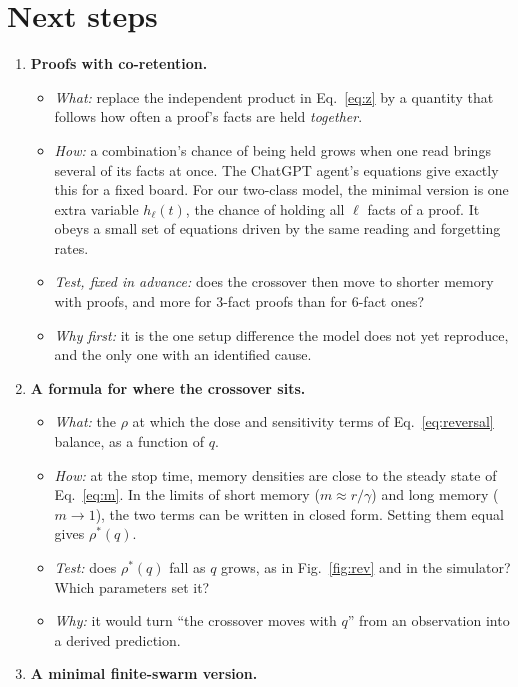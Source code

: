 \documentclass[10pt,a4paper]{article}
\begin{document}
\section{Next steps}
\label{sec:next}
\begin{enumerate}
\item \textbf{Proofs with co-retention.}
  \begin{itemize}
  \item \emph{What:} replace the independent product in Eq.~\eqref{eq:z} by a quantity that follows how often a proof's
    facts are held \emph{together}.
  \item \emph{How:} a combination's chance of being held grows when one read brings several of its facts at once. The
    ChatGPT agent's equations give exactly this for a fixed board. For our two-class model, the minimal version is one
    extra variable $h_\ell(t)$, the chance of holding all $\ell$ facts of a proof. It obeys a small set of equations
    driven by the same reading and forgetting rates.
  \item \emph{Test, fixed in advance:} does the crossover then move to shorter memory with proofs, and more for 3-fact
    proofs than for 6-fact ones?
  \item \emph{Why first:} it is the one setup difference the model does not yet reproduce, and the only one with an
    identified cause.
  \end{itemize}
\item \textbf{A formula for where the crossover sits.}
  \begin{itemize}
  \item \emph{What:} the $\rho$ at which the dose and sensitivity terms of Eq.~\eqref{eq:reversal} balance, as a
    function of $q$.
  \item \emph{How:} at the stop time, memory densities are close to the steady state of Eq.~\eqref{eq:m}. In the limits
    of short memory ($m\approx r/\gamma$) and long memory ($m\to1$), the two terms can be written in closed form. Setting
    them equal gives $\rho^*(q)$.
  \item \emph{Test:} does $\rho^*(q)$ fall as $q$ grows, as in Fig.~\ref{fig:rev} and in the simulator? Which parameters
    set it?
  \item \emph{Why:} it would turn ``the crossover moves with $q$'' from an observation into a derived prediction.
  \end{itemize}
\item \textbf{A minimal finite-swarm version.}
  \begin{itemize}

\end{itemize}
\end{enumerate}
\end{document}
